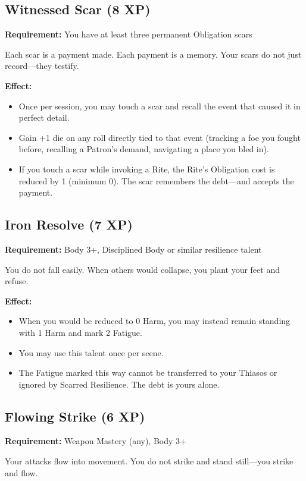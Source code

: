 \subsection{Witnessed Scar (8 XP)}

\textbf{Requirement:} You have at least three permanent Obligation scars

Each scar is a payment made. Each payment is a memory. Your scars do not just record—they testify.

\textbf{Effect:}
\begin{itemize}
\item Once per session, you may touch a scar and recall the event that caused it in perfect detail.
\item Gain +1 die on any roll directly tied to that event (tracking a foe you fought before, recalling a Patron's demand, navigating a place you bled in).
\item If you touch a scar while invoking a Rite, the Rite's Obligation cost is reduced by 1 (minimum 0). The scar remembers the debt—and accepts the payment.
\end{itemize}

\subsection{Iron Resolve (7 XP)}

\textbf{Requirement:} Body 3+, Disciplined Body or similar resilience talent

You do not fall easily. When others would collapse, you plant your feet and refuse.

\textbf{Effect:}
\begin{itemize}
\item When you would be reduced to 0 Harm, you may instead remain standing with 1 Harm and mark 2 Fatigue.
\item You may use this talent once per scene.
\item The Fatigue marked this way cannot be transferred to your Thiasos or ignored by Scarred Resilience. The debt is yours alone.
\end{itemize}

\subsection{Flowing Strike (6 XP)}

\textbf{Requirement:} Weapon Mastery (any), Body 3+

Your attacks flow into movement. You do not strike and stand still—you strike and flow.

